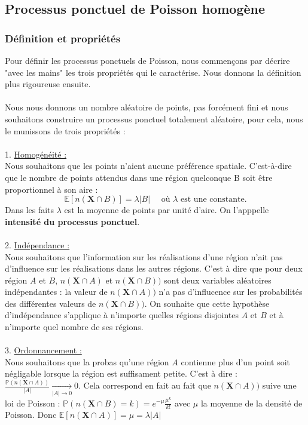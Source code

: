 \documentclass[12pt]{article}
\begin{document}
\subsection{Processus ponctuel de Poisson homogène}
\subsubsection*{Définition et propriétés}
Pour définir les processus ponctuels de Poisson, nous commençons par décrire "avec les mains" les trois propriétés qui le caractérise. Nous donnons la définition plus rigoureuse ensuite.\\
\\
Nous nous donnons un nombre aléatoire de points, pas forcément fini et nous souhaitons construire un processus ponctuel totalement aléatoire, pour cela, nous le munissons de trois propriétés :\\
\\
1. \underline{Homogénéité :}\\
Nous souhaitons que les points n'aient aucune préférence spatiale. C'est-à-dire que le nombre de points attendus dans une région quelconque B soit être proportionnel à son aire : 
\[
\mathbb{E}[n(\textbf{X}\cap B)] = \lambda|B| \quad \text{ où } \lambda \text{ est une constante.} 
\]
\newline
Dans les faits $\lambda$ est la moyenne de points par unité d'aire. On l'apppelle \textbf{intensité du processus ponctuel}.\\
\\
2. \underline{Indépendance :}\\
Nous souhaitons que l'information sur les réalisations d'une région n'ait pas d'influence sur les réalisations dans les autres régions. C'est à dire que pour deux région $A$ et $B$, $n(\textbf{X}\cap A)$ et $n(\textbf{X}\cap B))$ sont deux variables aléatoires indépendantes : la valeur de $n(\textbf{X}\cap A))$ n'a pas d'influcence sur les probabilités des différentes valeurs de $n(\textbf{X}\cap B))$. On souhaite que cette hypothèse d'indépendance s'applique à n'importe quelles régions disjointes $A$ et $B$ et à n'importe quel nombre de ses régions.\\
\\
3. \underline{Ordonnancement :}\\
Nous souhaitons que la probas qu'une région $A$ contienne plus d'un point soit négligable lorsque la région est suffisament petite. C'est à dire :
$\frac{\mathbb{P}(n(\textbf{X}\cap A))}{|A|} \underset{|A|\to 0 }{\longrightarrow} 0$.  Cela correspond en fait au fait que $n(\textbf{X}\cap A))$ suive une loi de Poisson : $\mathbb{P}(n(\textbf{X}\cap B)=k) = e^{-\mu}\frac{\mu^k}{k!}$ avec $\mu$ la moyenne de la densité de Poisson. Donc $\mathbb{E}[n(\textbf{X}\cap A)] = \mu = \lambda|A|$\\
\end{document}
